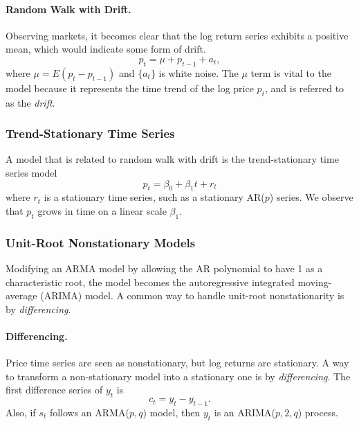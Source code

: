 \paragraph{Random Walk with Drift.} Observing markets, it becomes clear that the log return series exhibits a positive mean, which would indicate some form of drift.
\begin{equation}
p_t = \mu +p_{t-1} + a_t,
\end{equation}
where $\mu=E(p_t - p_{t-1})$ and $\{a_t\}$ is white noise. The $\mu$ term is vital to the model because it represents the time trend of the log price $p_t$, and is referred to as the \emph{drift}.

\subsubsection{Trend-Stationary Time Series}
A model that is related to random walk with drift is the trend-stationary time series model
\[
p_t = \beta_0 + \beta_1 t+r_t
\]
where $r_t$ is a stationary time series, such as a stationary AR($p$) series. We observe that $p_t$ grows in time on a linear scale $\beta_1$.

\subsubsection{Unit-Root Nonstationary Models}
Modifying an ARMA model by allowing the AR polynomial to have 1 as a characteristic root, the model becomes the autoregressive integrated moving-average (ARIMA) model. A common way to handle unit-root nonstationarity is by \emph{differencing}.

\paragraph{Differencing.} Price time series are seen as nonstationary, but log returns are stationary. A way to transform a non-stationary model into a stationary one is by \emph{differencing}. The first difference series of $y_t$ is
\[
c_t = y_t - y_{t-1}.
\]
Also, if $s_t$ follows an ARMA($p,q$) model, then $y_t$ is an ARIMA($p,2,q$) process.

